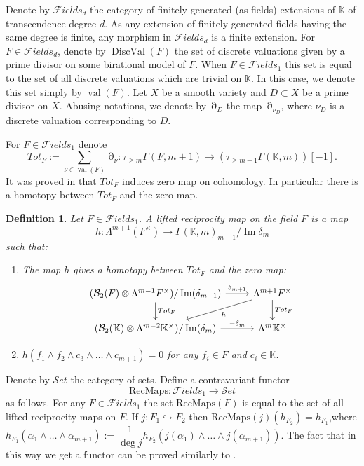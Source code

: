 \documentclass[12pt]{extarticle}
\newtheorem{definition}[theorem]{Definition}
\def\mb{\mathbb}
\def\mc{\mathcal}
\def\L{\Lambda}
\def\k{\mb K}
\def\t{\times}
\def\emb{\hookrightarrow}
\def\wdw{\wedge\dots\wedge}
\def\Set{{\mc Set}}
\def\F{{\mc Fields}}
\def\B{{\mc B}}
\newcommand{\SRL}{\mathrm{RecMaps}}
\DeclareMathOperator{\ts}{\partial}
\DeclareMathOperator{\val}{val}
\DeclareMathOperator{\im}{Im}
\DeclareMathOperator{\dval}{DiscVal}
\begin{document}
Denote by $\F_d$ the category of finitely generated (as fields) extensions of $\k$ of transcendence degree $d$. As any extension of finitely generated fields having the same degree is finite, any morphism in $\F_d$ is a finite extension.  For $F\in \F_d$, denote by $\dval(F)$ the set of discrete valuations given by a prime divisor on some birational model of $F$. When $F\in\F_1$ this set is equal to the set of all discrete valuations which are trivial on $\k$. In this case, we denote this set simply by $\val(F)$. Let $X$ be a smooth variety and $D\subset X$ be a prime divisor on $X$. Abusing notations, we denote by $\ts_D$ the map $\ts_{\nu_D}$, where $\nu_D$ is a discrete valuation corresponding to $D$. 

For $F\in\F_1$ denote
$$Tot_F:=\sum\limits_{\nu\in\val(F)}\ts_\nu\colon \tau_{\geq m}\Gamma(F, m+1)\to (\tau_{\geq m-1}\Gamma(\k, m))[-1].$$
It was proved in \cite{rudenko2021strong} that $Tot_F$ induces zero map on cohomology. In particular there is a homotopy between $Tot_F$ and the zero map.

\begin{definition}
\label{def:SRL}
    Let $F\in \F_1$. 
    \emph{A lifted reciprocity map} on the field $F$  is a map $$h\colon \L^{m+1}(F^\t)\to \Gamma(\k,m)_{m-1}/\im \delta_{m}$$
    such that:
    \begin{enumerate}
    \item The map $h$ gives a homotopy between $Tot_F$ and the zero map:
    \begin{equation}
    \label{diagram:SRL_def}
        \begin{tikzcd}
            (\B_2(F)\otimes \L^{m-1}F^\t)/         \im(\delta_{m+1})\ar[d,"Tot_F"]\ar[r,"\delta_{m+1}"]& \L^{m+1}F^\t \ar[d,"Tot_F"]\ar[dl,"h"]\\
            (\B_2(\k)\otimes \L^{m-2}\k^\t)/\im(\delta_m)\ar[r,"-\delta_{m}"] & \L^{m}\k^\t          
        \end{tikzcd}
    \end{equation}
        \item $h(f_1\wedge f_2\wedge c_3\wdw c_{m+1})=0$
        for any $f_i\in F$ and  $c_i\in\k$. 
        
        
    \end{enumerate}
\end{definition}

Denote by $\Set$ the category of sets. 
Define a contravariant functor $$\SRL\colon \F_1\to \Set$$ as follows. For any $F\in \F_1$ the set $\SRL(F)$ is equal to the set of all lifted reciprocity maps on $F$. If $j\colon F_1\emb F_2$ then $\SRL(j)(h_{F_2})=h_{F_1}$,where $h_{F_1}(\alpha_1\wdw \alpha_{m+1}):=\dfrac 1{\deg j}h_{F_2}(j(\alpha_1)\wdw j(\alpha_{m+1}))$. The fact that in this way we get a functor can be proved similarly to \cite[Proposition 2.1]{bolbachan_2023_chow}.
\end{document}
